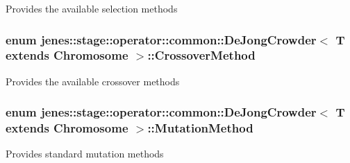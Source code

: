 Provides the available selection methods \hypertarget{classjenes_1_1stage_1_1operator_1_1common_1_1_de_jong_crowder_3_01_t_01extends_01_chromosome_01_4_cd306135cc2dd505a1a981b36f4696ea}{
\subsubsection[CrossoverMethod]{\setlength{\rightskip}{0pt plus 5cm}enum jenes::stage::operator::common::DeJongCrowder$<$ T extends Chromosome $>$::{\bf CrossoverMethod}}}
\label{classjenes_1_1stage_1_1operator_1_1common_1_1_de_jong_crowder_3_01_t_01extends_01_chromosome_01_4_cd306135cc2dd505a1a981b36f4696ea}


Provides the available crossover methods \hypertarget{classjenes_1_1stage_1_1operator_1_1common_1_1_de_jong_crowder_3_01_t_01extends_01_chromosome_01_4_8f83051fb5a66142aaec4b66fddfff5c}{
\subsubsection[MutationMethod]{\setlength{\rightskip}{0pt plus 5cm}enum jenes::stage::operator::common::DeJongCrowder$<$ T extends Chromosome $>$::{\bf MutationMethod}}}
\label{classjenes_1_1stage_1_1operator_1_1common_1_1_de_jong_crowder_3_01_t_01extends_01_chromosome_01_4_8f83051fb5a66142aaec4b66fddfff5c}


Provides standard mutation methods 

